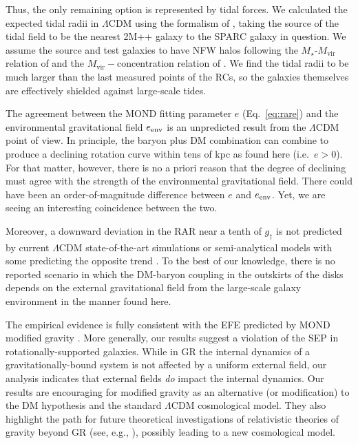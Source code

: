 \documentclass[twocolumn,tighten]{aastex63}
\begin{document}
Thus, the only remaining option is represented by tidal forces. We calculated the expected tidal radii in $\Lambda$CDM using the formalism of \cite{King62}, taking the source of the tidal field to be the nearest 2M++ galaxy to the SPARC galaxy in question. We assume the source and test galaxies to have NFW \citep{NFW} halos following the $M_\star$-$M_\text{vir}$ relation of \cite{Krav18} and the $M_\text{vir}-$concentration relation of \cite{DK15}. We find the tidal radii to be much larger than the last measured points of the RCs, so the galaxies themselves are effectively shielded against large-scale tides.

The agreement between the MOND fitting parameter $e$ (Eq.~\ref{eq:rare}) and the environmental gravitational field $e_{\rm env}$ is an unpredicted result from the $\Lambda$CDM point of view. In principle, the baryon plus DM combination can combine to produce a declining rotation curve within tens of kpc as found here (i.e.\ $e>0$). For that matter, however, there is no a priori reason that the degree of declining must agree with the strength of the environmental gravitational field. There could have been an order-of-magnitude difference between $e$ and $e_{\rm env}$. Yet, we are seeing an interesting coincidence between the two.

Moreover, a downward deviation in the RAR near a tenth of $g_\dagger$ is not predicted by current $\Lambda$CDM state-of-the-art simulations or semi-analytical models \citep{DCL16,Des17,Nav17,KW17,Ten18} with some predicting the opposite trend \citep{Lud17,Fat18,Gar19}. To the best of our knowledge, there is no reported scenario in which the DM-baryon coupling in the outskirts of the disks depends on the external gravitational field from the large-scale galaxy environment in the manner found here. 

The empirical evidence is fully consistent with the EFE predicted by MOND modified gravity \citep{BM84}. More generally, our results suggest a violation of the SEP in rotationally-supported galaxies. While in GR the internal dynamics of a gravitationally-bound system is not affected by a uniform external field, our analysis indicates that external fields \emph{do} impact the internal dynamics. Our results are encouraging for modified gravity as an alternative (or modification) to the DM hypothesis and the standard $\Lambda$CDM cosmological model. They also highlight the path for future theoretical investigations of relativistic theories of gravity beyond GR (see, e.g., \citealt{Skor20}), possibly leading to a new cosmological model.
\end{document}
